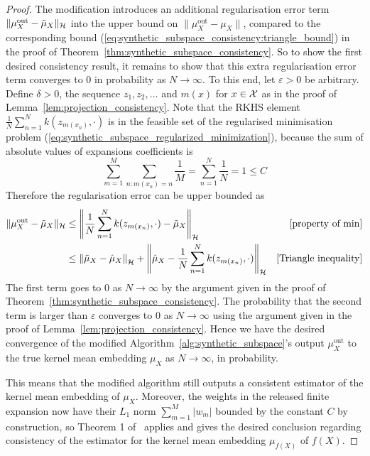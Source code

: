 \begin{theorem}
\begin{proof}
		The modification introduces an additional regularisation error term $\| {\mu}_X^{\text{out}} - \tilde{\mu}_X \|_{\mathcal{H}}$ into the upper bound on $\| {\mu}_X^{\text{out}} - \mu_X \|$, compared to the corresponding bound (\ref{eq:synthetic_subspace_consistency:triangle_bound}) in the proof of Theorem~\ref{thm:synthetic_subspace_consistency}. So to show the first desired consistency result, it remains to show that this extra regularisation error term converges to $0$ in probability as $N \to \infty$. To this end, let $\varepsilon > 0$ be arbitrary. Define $\delta > 0$, the sequence $z_1, z_2, \ldots$ and $m(x)$ for $x \in \mathcal{X}$ as in the proof of Lemma~\ref{lem:projection_consistency}. Note that the RKHS element $\frac{1}{N} \sum_{n = 1}^N k(z_{m(x_n)}, \cdot)$ is in the feasible set of the regularised minimisation problem (\ref{eq:synthetic_subspace_regularized_minimization}), because the sum of absolute values of expansions coefficients is
		\begin{equation}
		\sum_{m = 1}^M \sum_{n : m(x_n) = n} \frac{1}{M}
		=
		\sum_{n = 1}^N \frac{1}{N}
		=
		1
		\leq C
		\end{equation}
		Therefore the regularisation error can be upper bounded as
		\begin{align}
		\| {\mu}_X^{\text{out}} - \tilde{\mu}_X \|_{\mathcal{H}}
		&\leq
		\left\|
		\frac{1}{N} \sum_{n = 1}^N k(z_{m(x_n)}, \cdot) - \tilde{\mu}_X
		\right\|_{\mathcal{H}}
		& \text{[property of min]}\nonumber
		\\ &\leq
		\left\|
		\tilde{\mu}_X - \hat{\mu}_X
		\right\|_{\mathcal{H}}
		+
		\left\|
		\hat{\mu}_X - \frac{1}{N} \sum_{n = 1}^N k(z_{m(x_n)}, \cdot)
		\right\|_{\mathcal{H}}
		& \text{[Triangle inequality]}\nonumber
		\end{align}
		The first term goes to $0$ as $N \to \infty$ by the argument given in the proof of Theorem~\ref{thm:synthetic_subspace_consistency}. The probability that the second term is larger than $\varepsilon$ converges to $0$ as $N \to \infty$ using the argument given in the proof of Lemma~\ref{lem:projection_consistency}. Hence we have the desired convergence of the modified Algorithm~\ref{alg:synthetic_subspace}'s output ${\mu}_X^{\text{out}}$ to the true kernel mean embedding $\mu_X$ as $N \to \infty$, in probability.
		
		This means that the modified algorithm still outputs a consistent estimator of the kernel mean embedding of $\mu_X$. Moreover, the weights in the released finite expansion now have their $L_1$ norm $\sum_{m = 1}^M |w_m|$ bounded by the constant $C$ by construction, so Theorem 1 of~\cite{scibior_consistent_2016} applies and gives the desired conclusion regarding consistency of the estimator for the kernel mean embedding $\mu_{f(X)}$ of $f(X)$.
	\end{proof}
\end{theorem}



